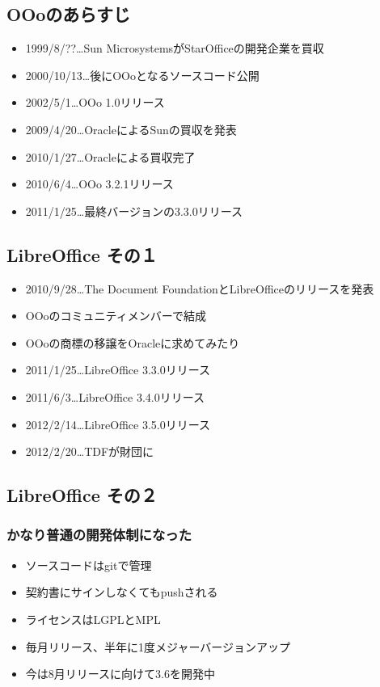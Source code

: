 \documentclass[mingoth,a4paper]{jsarticle}
\begin{document}
\subsection{OOoのあらすじ}

\begin{itemize}
\item 1999/8/??…Sun MicrosystemsがStarOfficeの開発企業を買収
\item 2000/10/13…後にOOoとなるソースコード公開
\item 2002/5/1…OOo 1.0リリース
\item 2009/4/20…OracleによるSunの買収を発表
\item 2010/1/27…Oracleによる買収完了
\item 2010/6/4…OOo 3.2.1リリース
\item 2011/1/25…最終バージョンの3.3.0リリース
\end{itemize}

\subsection{LibreOffice その１}

\begin{itemize}
\item 2010/9/28…The Document FoundationとLibreOfficeのリリースを発表
\item OOoのコミュニティメンバーで結成
\item OOoの商標の移譲をOracleに求めてみたり
\item 2011/1/25…LibreOffice 3.3.0リリース
\item 2011/6/3…LibreOffice 3.4.0リリース
\item 2012/2/14…LibreOffice 3.5.0リリース
\item 2012/2/20…TDFが財団に
\end{itemize}

\subsection{LibreOffice その２}
\subsubsection{かなり普通の開発体制になった}

\begin{itemize}
\item ソースコードはgitで管理
\item 契約書にサインしなくてもpushされる
\item ライセンスはLGPLとMPL
\item 毎月リリース、半年に1度メジャーバージョンアップ
\item 今は8月リリースに向けて3.6を開発中
\end{itemize}
\end{document}
